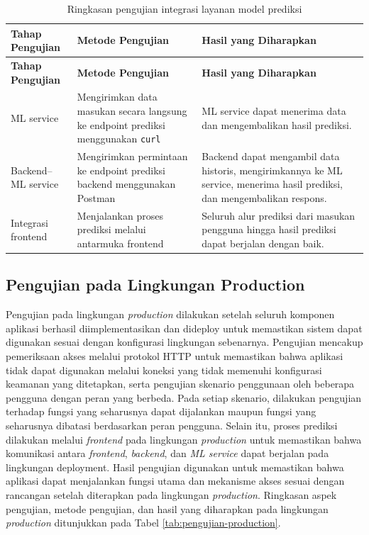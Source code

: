 \begin{longtable}{|p{3.2cm}|p{4.0cm}|p{4.0cm}|}
    \caption{Ringkasan pengujian integrasi layanan model prediksi}
    \label{tab:pengujian-prediksi} \\
    \hline
    \textbf{Tahap Pengujian} & \textbf{Metode Pengujian} & \textbf{Hasil yang Diharapkan} \\
    \hline
    \endfirsthead

    \hline
    \textbf{Tahap Pengujian} & \textbf{Metode Pengujian} & \textbf{Hasil yang Diharapkan} \\
    \hline
    \endhead

    ML service &
    Mengirimkan data masukan secara langsung ke endpoint prediksi menggunakan \texttt{curl} &
    ML service dapat menerima data dan mengembalikan hasil prediksi. \\
    \hline
    Backend--ML service &
    Mengirimkan permintaan ke endpoint prediksi backend menggunakan Postman &
    Backend dapat mengambil data historis, mengirimkannya ke ML service, menerima hasil prediksi, dan mengembalikan respons. \\
    \hline
    Integrasi frontend &
    Menjalankan proses prediksi melalui antarmuka frontend &
    Seluruh alur prediksi dari masukan pengguna hingga hasil prediksi dapat berjalan dengan baik. \\
    \hline
\end{longtable}

\subsection{Pengujian pada Lingkungan Production}

Pengujian pada lingkungan \textit{production} dilakukan setelah seluruh komponen aplikasi berhasil diimplementasikan dan dideploy untuk memastikan sistem dapat digunakan sesuai dengan konfigurasi lingkungan sebenarnya. Pengujian mencakup pemeriksaan akses melalui protokol HTTP untuk memastikan bahwa aplikasi tidak dapat digunakan melalui koneksi yang tidak memenuhi konfigurasi keamanan yang ditetapkan, serta pengujian skenario penggunaan oleh beberapa pengguna dengan peran yang berbeda. Pada setiap skenario, dilakukan pengujian terhadap fungsi yang seharusnya dapat dijalankan maupun fungsi yang seharusnya dibatasi berdasarkan peran pengguna. Selain itu, proses prediksi dilakukan melalui \textit{frontend} pada lingkungan \textit{production} untuk memastikan bahwa komunikasi antara \textit{frontend}, \textit{backend}, dan \textit{ML service} dapat berjalan pada lingkungan deployment. Hasil pengujian digunakan untuk memastikan bahwa aplikasi dapat menjalankan fungsi utama dan mekanisme akses sesuai dengan rancangan setelah diterapkan pada lingkungan \textit{production}. Ringkasan aspek pengujian, metode pengujian, dan hasil yang diharapkan pada lingkungan \textit{production} ditunjukkan pada Tabel \ref{tab:pengujian-production}.

